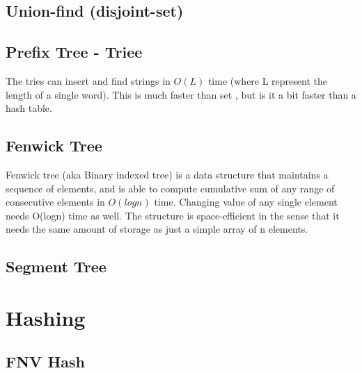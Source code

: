 \documentclass[10pt,letterpaper,twocolumn,twosided]{article}
\newcommand{\codigofuente}[1]{

\dotfill
}
\begin{document}
\codigofuente{src/structures/rmq.cpp}

\subsection{Union-find (disjoint-set)}

\codigofuente{src/structures/uf.cpp}


\subsection{Prefix Tree - Triee}

The tries can insert and find strings in $O(L)$ time (where L represent the length of a single word). This is much faster than set , but is it a bit faster than a hash table.

\codigofuente{src/structures/trie.cpp}


\subsection{Fenwick Tree}

Fenwick tree (aka Binary indexed tree) is a data structure that maintains a sequence of elements, and is able to compute cumulative sum of any range of consecutive elements in $O(logn)$ time. Changing value of any single element needs O(logn) time as well.
The structure is space-efficient in the sense that it needs the same amount of storage as just a simple array of n elements.

\codigofuente{src/structures/fenwick.cpp}

\subsection{Segment Tree}

\codigofuente{src/structures/segment.cpp}



\section{Hashing} %

\subsection{FNV Hash}

\codigofuente{src/hashing/FNV.cpp}
\end{document}
